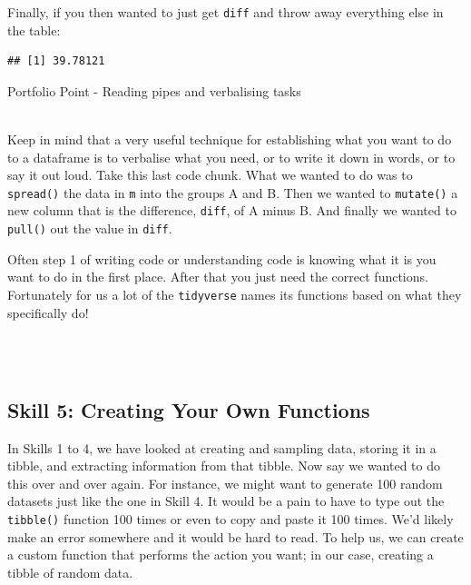\documentclass[]{book}
\newenvironment{Shaded}{\begin{snugshade}}{\end{snugshade}}
\newcommand{\DataTypeTok}[1]{\textcolor[rgb]{0.13,0.29,0.53}{#1}}
\newcommand{\KeywordTok}[1]{\textcolor[rgb]{0.13,0.29,0.53}{\textbf{#1}}}
\newcommand{\NormalTok}[1]{#1}
\newcommand{\OperatorTok}[1]{\textcolor[rgb]{0.81,0.36,0.00}{\textbf{#1}}}
\newcommand{\StringTok}[1]{\textcolor[rgb]{0.31,0.60,0.02}{#1}}
\newenvironment{info}
    {
    \hline\\
    }
    { 
    \\\\\hline
    }
\begin{document}
Finally, if you then wanted to just get \texttt{diff} and throw away everything else in the table:

\begin{Shaded}
\end{Shaded}

\begin{verbatim}
## [1] 39.78121
\end{verbatim}

Portfolio Point - Reading pipes and verbalising tasks

\begin{info}
Keep in mind that a very useful technique for establishing what you want
to do to a dataframe is to verbalise what you need, or to write it down
in words, or to say it out loud. Take this last code chunk. What we
wanted to do was to \texttt{spread()} the data in \texttt{m} into the
groups A and B. Then we wanted to \texttt{mutate()} a new column that is
the difference, \texttt{diff}, of A minus B. And finally we wanted to
\texttt{pull()} out the value in \texttt{diff}.

Often step 1 of writing code or understanding code is knowing what it is
you want to do in the first place. After that you just need the correct
functions. Fortunately for us a lot of the \texttt{tidyverse} names its
functions based on what they specifically do!
\end{info}

\hypertarget{skill-5-creating-your-own-functions}{%
\subsection{Skill 5: Creating Your Own Functions}\label{skill-5-creating-your-own-functions}}

In Skills 1 to 4, we have looked at creating and sampling data, storing it in a tibble, and extracting information from that tibble. Now say we wanted to do this over and over again. For instance, we might want to generate 100 random datasets just like the one in Skill 4. It would be a pain to have to type out the \texttt{tibble()} function 100 times or even to copy and paste it 100 times. We'd likely make an error somewhere and it would be hard to read. To help us, we can create a custom function that performs the action you want; in our case, creating a tibble of random data.
\end{document}
